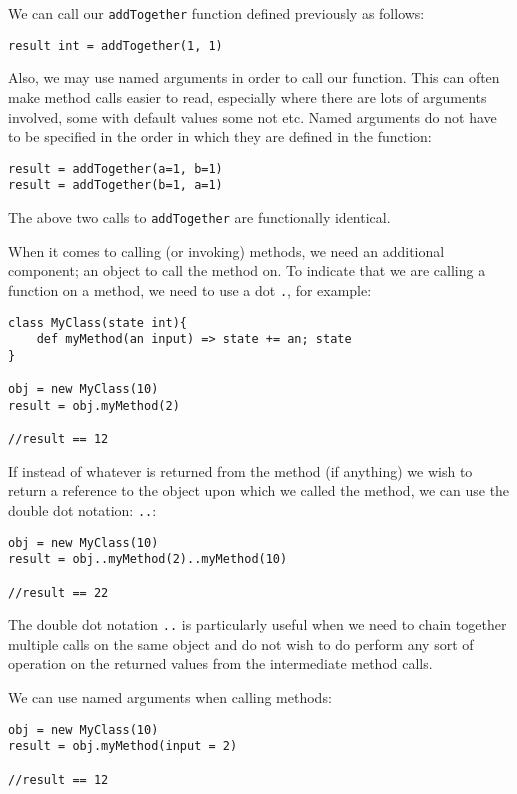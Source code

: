 \documentclass[conc-doc]{subfiles}
\begin{document}
We can call our \lstinline{addTogether} function defined previously as follows:
\begin{lstlisting}
result int = addTogether(1, 1)
\end{lstlisting}

Also, we may use named arguments in order to call our function. This can often make method calls easier to read, especially where there are lots of arguments involved, some with default values some not etc. Named arguments do not have to be specified in the order in which they are defined in the function:

\begin{lstlisting}
result = addTogether(a=1, b=1)
result = addTogether(b=1, a=1)
\end{lstlisting}

The above two calls to \lstinline{addTogether} are functionally identical.

When it comes to calling (or invoking) methods, we need an additional component; an object to call the method on. To indicate that we are calling a function on a method, we need to use a dot \lstinline{.}, for example:

\begin{lstlisting}
class MyClass(state int){
	def myMethod(an input) => state += an; state
}

obj = new MyClass(10)
result = obj.myMethod(2)

//result == 12
\end{lstlisting}

If instead of whatever is returned from the method (if anything) we wish to return a reference to the object upon which we called the method, we can use the double dot notation: \lstinline{..}:

\begin{lstlisting}
obj = new MyClass(10)
result = obj..myMethod(2)..myMethod(10)

//result == 22
\end{lstlisting}

The double dot notation \lstinline{..} is particularly useful when we need to chain together multiple calls on the same object and do not wish to do perform any sort of operation on the returned values from the intermediate method calls.

We can use named arguments when calling methods:

\begin{lstlisting}
obj = new MyClass(10)
result = obj.myMethod(input = 2)

//result == 12
\end{lstlisting}
\end{document}
